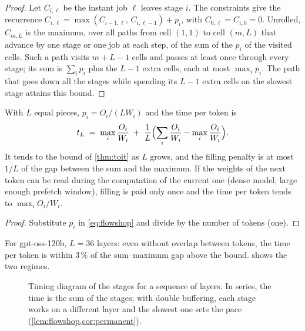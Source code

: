 \begin{proof}
Let $C_{i,\ell}$ be the instant job $\ell$ leaves stage $i$. The constraints give the recurrence $C_{i,\ell} = \max(C_{i-1,\ell},\, C_{i,\ell-1}) + p_i$, with $C_{0,\ell} = C_{i,0} = 0$. Unrolled, $C_{m,L}$ is the maximum, over all paths from cell $(1,1)$ to cell $(m,L)$ that advance by one stage or one job at each step, of the sum of the $p_i$ of the visited cells. Such a path visits $m + L - 1$ cells and passes at least once through every stage; its sum is $\sum_i p_i$ plus the $L-1$ extra cells, each at most $\max_i p_i$. The path that goes down all the stages while spending its $L-1$ extra cells on the slowest stage attains this bound.
\end{proof}

\begin{corollaire}\label{cor:permanent}
With $L$ equal pieces, $p_i = O_i / (L W_i)$ and the time per token is
\begin{equation}\label{eq:permanent}
t_L \;=\; \max_i \frac{O_i}{W_i} \;+\; \frac{1}{L} \Bigl( \sum_i \frac{O_i}{W_i} - \max_i \frac{O_i}{W_i} \Bigr).
\end{equation}
It tends to the bound of \cref{thm:toit} as $L$ grows, and the filling penalty is at most $1/L$ of the gap between the sum and the maximum. If the weights of the next token can be read during the computation of the current one (dense model, large enough prefetch window), filling is paid only once and the time per token tends to $\max_i O_i/W_i$.
\end{corollaire}

\begin{proof}
Substitute $p_i$ in \cref{eq:flowshop} and divide by the number of tokens (one).
\end{proof}

For gpt-oss-120b, $L = 36$ layers: even without overlap between tokens, the time per token is within 3\,\% of the sum--maximum gap above the bound.  shows the two regimes.

\begin{figure}[ht]
\centering
\SchemaChronogramme
\caption[Timing diagram: serial versus overlapped]{Timing diagram of the stages for a sequence of layers. In series, the time is the sum of the stages; with double buffering, each stage works on a different layer and the slowest one sets the pace (\cref{lem:flowshop,cor:permanent}).}
\label{fig:chronogramme}
\end{figure}


